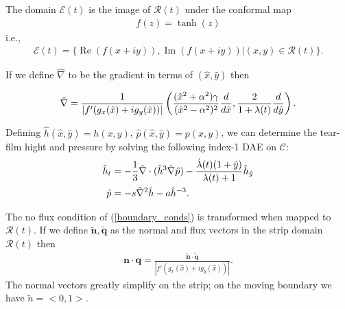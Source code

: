 The domain $\mathcal{E}(t)$ is the image of $\mathcal{R}(t)$ under the conformal map
\begin{align}
f(z) = \tanh(z)	
\end{align}
i.e.,
\begin{align}
\mathcal{E}(t) = \{\operatorname{Re}(f(x+iy)),\operatorname{Im}(f(x+iy))|(x,y) \in \mathcal{R}(t)  \}.
\end{align}

If we define $\hat{\nabla}$ to be the gradient in terms of $(\hat{x},\hat{y})$ then

\begin{align}
\hat{\nabla} = \frac{1}{|f'(g_x(\hat{x})+i g_y(\hat{x}))|} \left( \frac{(\hat{x}^2+\alpha^2)\gamma}{(\hat{x}^2-\alpha^2)^2} \frac{d}{d \hat{x}}, \frac{2}{1+\lambda(t)} \frac{d}{d \hat{y}} \right).
\end{align}

Defining $\hat{h}(\hat{x},\hat{y})=h(x,y)$, $\hat{p}(\hat{x},\hat{y})=p(x,y)$, we can determine the tear-film hight and pressure by solving the following index-1 DAE on $\mathcal{C}$:
\begin{align}
\begin{aligned}
\hat{h}_t &= -\frac{1}{3} \hat{\nabla} \cdot (\hat{h}^3 \hat{\nabla} \hat{p}) -\frac{\dot{\lambda}(t)(1+\hat{y})}{\lambda(t)+1} \hat{h}_{\hat{y}} \\
\hat{p} &= - s \hat{\nabla}^2 \hat{h} - a \hat{h}^{-3}.
\end{aligned}
\end{align}

The no flux condition of (\ref{boundary_conds}) is transformed when mapped to $\mathcal{R}(t)$. If we define $\bm{\tilde{n}},\bm{\tilde{q}}$ as the normal and flux vectors in the strip domain $\mathcal{R}(t)$ then
\begin{align}
\bm{n} \cdot \bm{q} = \frac{\bm{\tilde{n}} \cdot \bm{\tilde{q}}}{|f'(g_x(\hat{x})+i g_y(\hat{x}))|}.
\end{align}
The normal vectors greatly simplify on the strip; on the moving boundary we have $\tilde{n}=<0,1>$.




